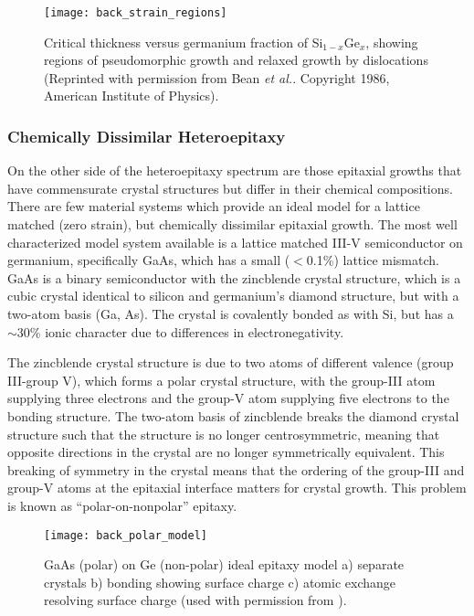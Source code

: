 \begin{figure}
 \centering \texttt{[image: back\_strain\_regions]}
 \caption[Critical thickness dependence on strain]{\label{fig:back_strain_regions}Critical thickness versus germanium fraction of Si\(_{1-x}\)Ge\(_x\), showing regions of pseudomorphic growth and relaxed growth by dislocations (Reprinted with permission from Bean \textit{et al.}\cite{Bean1986}.
  Copyright 1986, American Institute of Physics).}
\end{figure}
\subsubsection{Chemically Dissimilar Heteroepitaxy} On the other side of the heteroepitaxy spectrum are those epitaxial growths that have commensurate crystal structures but differ in their chemical compositions.
There are few material systems which provide an ideal model for a lattice matched (zero strain), but chemically dissimilar epitaxial growth.
The most well characterized model system available is a lattice matched III-V semiconductor on germanium, specifically GaAs, which has a small (\(<\)0.1\%) lattice mismatch.
GaAs is a binary semiconductor with the zincblende crystal structure, which is a cubic crystal identical to silicon and germanium's diamond structure, but with a two-atom basis (Ga, As).
The crystal is covalently bonded as with Si, but has a \(\sim\)30\% ionic character due to differences in electronegativity\cite{Christensen1987}.

The zincblende crystal structure is due to two atoms of different valence (group III-group V), which forms a polar crystal structure, with the group-III atom supplying three electrons and the group-V atom supplying five electrons to the bonding structure.
The two-atom basis of zincblende breaks the diamond crystal structure such that the structure is no longer centrosymmetric, meaning that opposite directions in the crystal are no longer symmetrically equivalent.
This breaking of symmetry in the crystal means that the ordering of the group-III and group-V atoms at the epitaxial interface matters for crystal growth.
This problem is known as ``polar-on-nonpolar'' epitaxy\cite{Biegelsen1992,Kroemer1987}.
\begin{figure}
 \centering \texttt{[image: back\_polar\_model]}
 \caption[Atomic model of polar on non-polar epitaxy]{\label{fig:back_polar_model}GaAs (polar) on Ge (non-polar) ideal epitaxy model a) separate crystals b) bonding showing surface charge c) atomic exchange resolving surface charge (used with permission from \cite{Biegelsen1992}).}
\end{figure}


